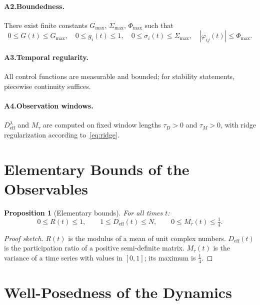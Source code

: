 \documentclass[11pt,a4paper]{article}
\theoremstyle{plain}
\newtheorem{proposition}[theorem]{Proposition}
\theoremstyle{definition}
\theoremstyle{remark}
\newcommand{\Deff}{D_{\mathrm{eff}}}
\newcommand{\Mtau}{M_{\tau}}
\newcommand{\Gmax}{G_{\max}}
\begin{document}
\paragraph{A2.\;Boundedness.}
There exist finite constants $\Gmax$, $\Sigma_{\max}$, $\Phi_{\max}$ such that
\[
0 \leq G(t) \leq \Gmax, \quad
0 \leq g_i(t) \leq 1, \quad
0 \leq \sigma_i(t) \leq \Sigma_{\max}, \quad
|\varphi_{ij}(t)| \leq \Phi_{\max}.
\]

\paragraph{A3.\;Temporal regularity.}
All control functions are measurable and bounded; for stability statements, piecewise continuity suffices.

\paragraph{A4.\;Observation windows.}
$\Deff^{\lambda}$ and $\Mtau$ are computed on fixed window lengths $\tau_D > 0$ and $\tau_M > 0$, with ridge regularization according to~\eqref{eq:ridge}.

\section{Elementary Bounds of the Observables}

\begin{proposition}[Elementary bounds]
\label{prop:schranken}
For all times $t$:
\begin{equation}
0 \leq R(t) \leq 1, \qquad
1 \leq \Deff(t) \leq N, \qquad
0 \leq \Mtau(t) \leq \tfrac{1}{4}.
\end{equation}
\end{proposition}

\begin{proof}[Proof sketch]
$R(t)$ is the modulus of a mean of unit complex numbers. $\Deff(t)$ is the participation ratio of a positive semi-definite matrix. $\Mtau(t)$ is the variance of a time series with values in $[0,1]$; its maximum is $\frac{1}{4}$.
\end{proof}

\section{Well-Posedness of the Dynamics}
\end{document}
